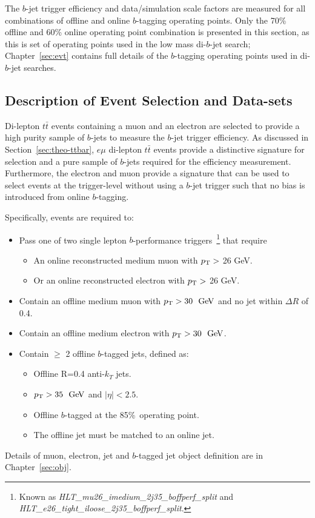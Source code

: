 The $b$-jet trigger efficiency and data/simulation scale factors are measured for all combinations of offline and online $b$-tagging operating points.
Only the 70\% offline and 60\% online operating point combination is presented in this section,
as this is set of operating points used in the low mass di-$b$-jet search;
Chapter~\ref{sec:evt} contains full details of the $b$-tagging operating points used in di-$b$-jet searches.

\subsection{Description of Event Selection and Data-sets}
\label{sec:trig-evtSel}

Di-lepton $t\bar{t}$ events containing a muon and an electron are selected to provide a high purity sample of $b$-jets to measure the $b$-jet trigger efficiency.
As discussed in Section~\ref{sec:theo-ttbar}, 
$e\mu$ di-lepton $t\bar{t}$ events provide a distinctive signature for selection and a pure sample of $b$-jets required for the efficiency measurement.
Furthermore, the electron and muon provide a signature that can be used to select events at the trigger-level without using a $b$-jet trigger
such that no bias is introduced from online $b$-tagging.

\noindent
Specifically, events are required to:
\vspace{-1em}
\begin{itemize}
\item Pass one of two single lepton $b$-performance triggers~\footnote{Known as \textit{HLT\_mu26\_imedium\_2j35\_boffperf\_split} and \textit{HLT\_e26\_tight\_iloose\_2j35\_boffperf\_split}.}
  that require
    \begin{itemize}[label={$-$}]
    \item An online reconstructed medium muon with $p_{\mathrm{T}} >$ 26 GeV.
    \item Or an online reconstructed electron with $p_{\mathrm{T}} >$ 26 GeV.
    \end{itemize}
\item Contain an offline medium muon with $\pT>30~\GeV$ and no jet within $\Delta R$ of 0.4.
\item Contain an offline medium electron with $\pT>30~\GeV$.
\item Contain $\geq$ 2 offline $b$-tagged jets, defined as:
   \begin{itemize}[label={$-$}]
     \item Offline R=0.4 anti-$k_T$ jets.
     \item $\pT>35~\GeV$ and $|\eta|<2.5$.
     \item Offline $b$-tagged at the 85\%~operating point.
     \item The offline jet must be matched to an online jet.
    \end{itemize}
\end{itemize}
Details of muon, electron, jet and $b$-tagged jet object definition are in Chapter~\ref{sec:obj}.


